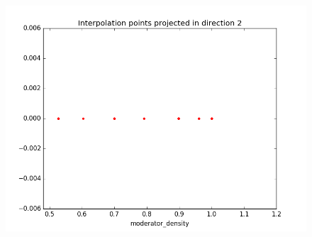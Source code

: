 \begin{figure}[h]
\begin{minipage}[b]{0.3\linewidth}
			\centering \includegraphics[scale=0.25]{images/MOX/interpolation_points_2_macro_totale0.png}
	 \end{minipage}
\end{figure}
